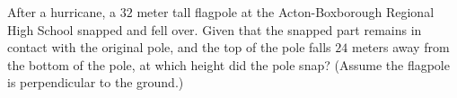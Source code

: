 After a hurricane, a $32$ meter tall flagpole at the Acton-Boxborough Regional High School snapped and fell over. Given that the snapped part remains in contact with the original pole, and the top of the pole falls $24$ meters away from the bottom of the pole, at which height did the pole snap? (Assume the flagpole is perpendicular to the ground.)
